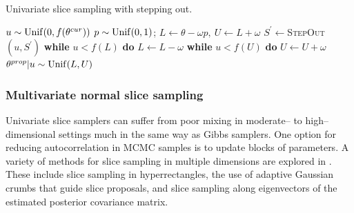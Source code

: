 \begin{algorithm}[htbp]
	\caption{Univariate slice sampling with stepping out.}\label{alg:univar_slice}
	\begin{algorithmic}[1]
		\State $ u \sim \mathrm{Unif}(0,f(\theta^{cur})) $
		\State $ p\sim \mathrm{Unif}(0,1) $; $ L \gets \theta - \omega p,\ U \gets L+\omega $ 
		\State $ S^\prime \gets $\textsc{StepOut}$ (u,S^\prime) $ 
		\State\hspace{\algorithmicindent}\textbf{while }{$ u<f(L) $} \textbf{do} $ L \gets L-\omega $
		\State\hspace{\algorithmicindent}\textbf{while }{$u<f(U)$} \textbf{do} $ U \gets U+\omega $
		\State $ \theta^{prop}|u\sim\mathrm{Unif}(L,U) $ 
		\State\Return{$ \new{\theta} $}
		\Else{}
		\EndIf 	
		\EndIf
		\EndProcedure
	\end{algorithmic}
\end{algorithm}

\subsubsection{Multivariate normal slice sampling}
\label{subsubsec:mvn_slice_sampling}

Univariate slice samplers can suffer from poor mixing in moderate-- to high--dimensional settings much in the same way as Gibbs samplers. One option for reducing autocorrelation in MCMC samples is to update blocks of parameters. A variety of methods for slice sampling in multiple dimensions are explored in \cite{neal2003slice,thompson2011slice,tibbits2014automated}. These include slice sampling in hyperrectangles, the use of adaptive Gaussian crumbs that guide slice proposals, and slice sampling along eigenvectors of the estimated posterior covariance matrix. 

